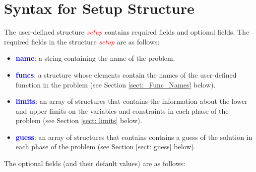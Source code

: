 \documentclass[10pt,final]{report}
\newcommand{\bfblue}[1]{\textcolor{blue}{\bf #1}}
\newcommand{\slred}[1]{\textcolor{red}{\sl #1}}
\begin{document}
\section{Syntax for Setup Structure  \label{sect: structure syntax}}

The user-defined structure \slred{setup} contains required fields and
optional fields.  The required fields in the structure \slred{setup}
are as follows:
\begin{itemize}
\item \bfblue{name}:  a string containing the name of the problem.
\item \bfblue{funcs}:  a structure whose elements contain the names
  of the user-defined function in the problem (see Section \ref{sect:_Func_Names} below).
\item \bfblue{limits}:  an array of structures that contains the
  information about the lower and upper limits on the variables and
  constraints in each phase of the problem (see Section \ref{sect: limits} below).
\item \bfblue{guess}:  an array of structures that contains
  contains a guess of the solution in each phase of the problem (see Section
  \ref{sect: guess} below).
\end{itemize}
The optional fields (and their default values) are as follows:
\end{document}
